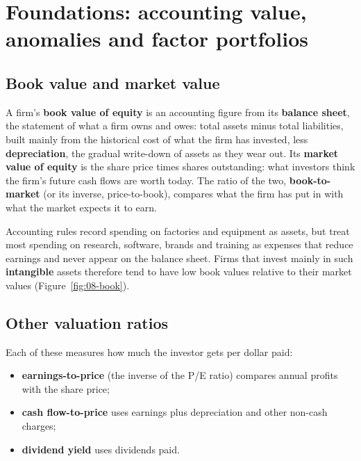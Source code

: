 \section{Foundations: accounting value, anomalies and factor portfolios}
\label{sec:08-foundations}

\subsection{Book value and market value}

A firm's \textbf{book value of equity} is an accounting figure from its \textbf{balance sheet}, the statement of what a firm owns and owes: total assets minus total liabilities, built mainly from the historical cost of what the firm has invested, less \textbf{depreciation}, the gradual write-down of assets as they wear out. Its \textbf{market value of equity} is the share price times shares outstanding: what investors think the firm's future cash flows are worth today. The ratio of the two, \textbf{book-to-market} (or its inverse, price-to-book), compares what the firm has put in with what the market expects it to earn.

Accounting rules record spending on factories and equipment as assets, but treat most spending on research, software, brands and training as expenses that reduce earnings and never appear on the balance sheet. Firms that invest mainly in such \textbf{intangible} assets therefore tend to have low book values relative to their market values (Figure~\ref{fig:08-book}).

\subsection{Other valuation ratios}

Each of these measures how much the investor gets per dollar paid:

\begin{itemize}
  \item \textbf{earnings-to-price} (the inverse of the P/E ratio) compares annual profits with the share price;
  \item \textbf{cash flow-to-price} uses earnings plus depreciation and other non-cash charges;
  \item \textbf{dividend yield} uses dividends paid.
\end{itemize}

